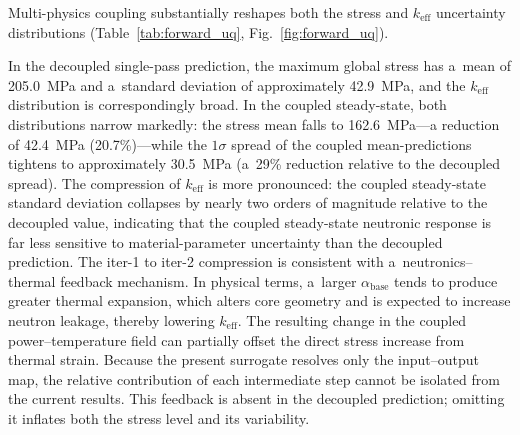 \documentclass[pdflatex,sn-mathphys-num]{sn-jnl}
\theoremstyle{thmstyleone}
\theoremstyle{thmstyletwo}
\theoremstyle{thmstylethree}
\begin{document}

Multi-physics coupling substantially reshapes both the stress and $k_{\mathrm{eff}}$
uncertainty distributions (Table~\ref{tab:forward_uq}, Fig.~\ref{fig:forward_uq}).

In the decoupled single-pass prediction, the maximum global stress has a~mean of
\SI{205.0}{MPa} and a~standard deviation of approximately \SI{42.9}{MPa}, and the
$k_{\mathrm{eff}}$ distribution is correspondingly broad.
In the coupled steady-state, both distributions narrow markedly: the stress mean
falls to \SI{162.6}{MPa}---a reduction of \SI{42.4}{MPa} (20.7\%)---while the
$1\sigma$ spread of the coupled mean-predictions tightens to approximately
\SI{30.5}{MPa} (a~29\% reduction relative to the decoupled spread).
The compression of $k_{\mathrm{eff}}$ is more pronounced: the coupled steady-state
standard deviation collapses by nearly two orders of magnitude relative to the
decoupled value, indicating that the coupled steady-state neutronic response is
far less sensitive to material-parameter uncertainty than the decoupled prediction.
The iter-1 to iter-2 compression is consistent with a~neutronics--thermal feedback
mechanism.
In physical terms, a~larger $\alpha_{\mathrm{base}}$ tends to produce greater
thermal expansion, which alters core geometry and is expected to increase neutron
leakage, thereby lowering $k_{\mathrm{eff}}$.
The resulting change in the coupled power--temperature field can partially offset
the direct stress increase from thermal strain.
Because the present surrogate resolves only the input--output map, the relative
contribution of each intermediate step cannot be isolated from the current results.
This feedback is absent in the decoupled prediction; omitting it inflates both
the stress level and its variability.
\end{document}
